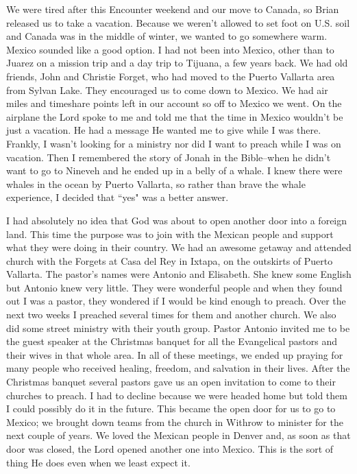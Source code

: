 \documentclass[oneside]{book}
\begin{document}
We were tired after this Encounter weekend and our move to Canada, so Brian released us to take a vacation. Because we weren't allowed to set foot on U.S. soil and Canada was in the middle of winter, we wanted to go somewhere warm.  Mexico sounded like a good option. I had not been into Mexico, other than to Juarez on a mission trip and a day trip to Tijuana, a few years back. We had old friends, John and Christie Forget, who had moved to the Puerto Vallarta area from Sylvan Lake. They encouraged us to come down to Mexico. We had air miles and timeshare points left in our account so off to Mexico we went. On the airplane the Lord spoke to me and told me that the time in Mexico wouldn't be just a vacation. He had a message He wanted me to give while I was there. Frankly, I wasn't looking for a ministry nor did I want to preach while I was on vacation. Then I remembered the story of Jonah in the Bible--when he didn't want to go to Nineveh and he ended up in a belly of a whale. I knew there were whales in the ocean by Puerto Vallarta, so rather than brave the whale experience, I decided that ``yes" was a better answer.

I had absolutely no idea that God was about to open another door into a foreign land. This time the purpose was to join with the Mexican people and support what they were doing in their country. We had an awesome getaway and attended church with the Forgets at Casa del Rey in Ixtapa, on the outskirts of Puerto Vallarta. The pastor's names were Antonio and Elisabeth. She knew some English but Antonio knew very little. They were wonderful people and when they found out I was a pastor, they wondered if I would be kind enough to preach. Over the next two weeks I preached several times for them and another church. We also did some street ministry with their youth group. Pastor Antonio invited me to be the guest speaker at the Christmas banquet for all the Evangelical pastors and their wives in that whole area. In all of these meetings, we ended up praying for many people who received healing, freedom, and salvation in their lives. After the Christmas banquet several pastors gave us an open invitation to come to their churches to preach. I had to decline because we were headed home but told them I could possibly do it in the future. This became the open door for us to go to Mexico; we brought down teams from the church in Withrow to minister for the next couple of years. We loved the Mexican people in Denver and, as soon as that door was closed, the Lord opened another one into Mexico. This is the sort of thing He does even when we least expect it. 
\end{document}
